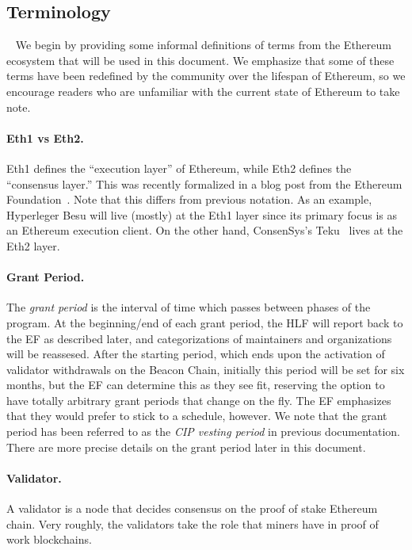\subsection{Terminology}~\label{sec:defs}
We begin by providing some informal definitions of terms from the Ethereum ecosystem that will be used in this document.  We emphasize that some of these terms have been redefined by the community over the lifespan of Ethereum, so we encourage readers who are unfamiliar with the current state of Ethereum to take note.

\paragraph{Eth1 vs Eth2.}  Eth1 defines the ``execution layer'' of Ethereum, while Eth2 defines the ``consensus layer.''  This was recently formalized in a blog post from the Ethereum Foundation~\cite{Eth1-2}.  Note that this differs from previous notation.  As an example, Hyperleger Besu will live (mostly) at the Eth1 layer since its primary focus is as an Ethereum execution client.  On the other hand, ConsenSys's Teku~\cite{Teku} lives at the Eth2 layer.

\paragraph{Grant Period.}  The \emph{grant period} is the interval of time which passes between phases of the program.  At the beginning/end of each grant period, the HLF will report back to the EF as described later, and categorizations of maintainers and organizations will be reassesed.  After the starting period, which ends upon the activation of validator withdrawals on the Beacon Chain, initially this period will be set for six months, but the EF can determine this as they see fit, reserving the option to have totally arbitrary grant periods that change on the fly.  The EF emphasizes that they would prefer to stick to a schedule, however.  We note that the grant period has been referred to as the \emph{CIP vesting period} in previous documentation.  There are more precise details on the grant period later in this document.

\paragraph{Validator.}  A validator is a node that decides consensus on the proof of stake Ethereum chain.  Very roughly, the validators take the role that miners have in proof of work blockchains.

